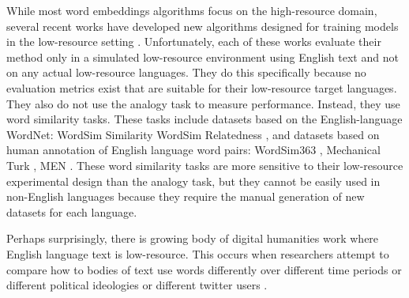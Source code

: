 \documentclass[11pt,a4paper]{article}
\DeclareMathOperator{\OddOneOut}{\texttt{OddOneOut}}
\DeclareMathOperator{\topk}{\texttt{Topk}}
\begin{document}
While most word embeddings algorithms focus on the high-resource domain,
several recent works have developed new algorithms designed for training models in the low-resource setting \cite{adams-etal-2017-cross,jiang2018learningword,gupta-etal-2019-improving,jungmaier-etal-2020-dirichlet}.
Unfortunately, each of these works evaluate their method only in a simulated low-resource environment using English text and not on any actual low-resource languages.
They do this specifically because no evaluation metrics exist that are suitable for their low-resource target languages.
They also do not use the analogy task to measure performance.
Instead, they use word similarity tasks.
These tasks include datasets based on the English-language WordNet:
WordSim Similarity \citep{zesch2008using}%
WordSim Relatedness \citep{agirre2009study},
and datasets based on human annotation of English language word pairs:
WordSim363 \citep{finkelstein2001placing},
Mechanical Turk \citep{radinsky2011word},
MEN \citep{bruni2012distributional}.
These word similarity tasks are more sensitive to their low-resource experimental design than the analogy task,
but they cannot be easily used in non-English languages because they require the manual generation of new datasets for each language.


Perhaps surprisingly, there is growing body of digital humanities work where English language text is low-resource.
This occurs when researchers attempt to compare how to bodies of text use words differently over different time periods \cite[e.g.][]{hamilton2016diachronic,hamilton2016cultural,kutuzov2018diachronic,kozlowski2019geometry,dubossarsky2017outta,tang2018state,szymanski2017temporal,liang2018dynamic,chen2017understanding}
or different political ideologies \citet{azarbonyad2017words}
or different twitter users \cite{kulkarni2015statistically}.
\end{document}

